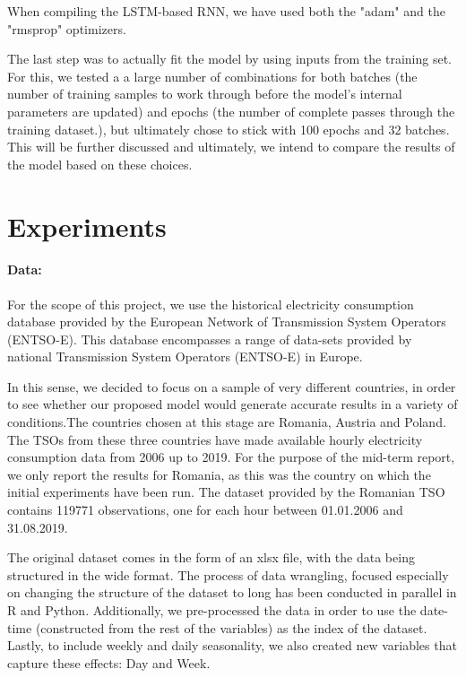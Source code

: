 \documentclass[10pt,twocolumn,letterpaper]{article}
\begin{document}
When compiling the LSTM-based RNN, we have used both the "adam" and the "rmsprop" optimizers.

The last step was to actually fit the model by using inputs from the training set. For this, we tested a a large number of combinations for both batches (the number of training samples to work through before the model’s internal parameters are updated) and epochs (the number of complete passes through the training dataset.), but ultimately chose to stick with 100 epochs and 32 batches. This will be further discussed and ultimately, we intend to compare the results of the model based on these choices.

\section{Experiments}
\paragraph{Data:} For the scope of this project, we use the historical electricity consumption database provided by the European Network of Transmission System Operators (ENTSO-E). This database encompasses a range of data-sets provided by national Transmission System Operators (ENTSO-E) in Europe. 

In this sense, we decided to focus on a sample of very different countries, in order to see whether our proposed model would generate accurate results in a variety of conditions.The countries chosen at this stage are Romania, Austria and Poland. The TSOs from these three countries have made available hourly electricity consumption data from 2006 up to 2019. For the purpose of the mid-term report, we only report the results for Romania, as this was the country on which the initial experiments have been run. The dataset provided by the Romanian TSO contains 119771 observations, one for each hour between 01.01.2006 and 31.08.2019.

The original dataset comes in the form of an xlsx file, with the data being structured in the wide format. The process of data wrangling, focused especially on changing the structure of the dataset to long has been conducted in parallel in R and Python. Additionally, we pre-processed the data in order to use the date-time (constructed from the rest of the variables) as the index of the dataset. Lastly, to include weekly and daily seasonality, we also created new variables that capture these effects: Day and Week.
\end{document}
